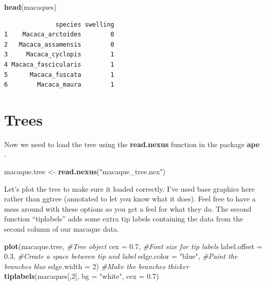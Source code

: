 \documentclass[
]{book}
\newenvironment{Shaded}{\begin{snugshade}}{\end{snugshade}}
\newcommand{\CommentTok}[1]{\textcolor[rgb]{0.56,0.35,0.01}{\textit{#1}}}
\newcommand{\DataTypeTok}[1]{\textcolor[rgb]{0.13,0.29,0.53}{#1}}
\newcommand{\DecValTok}[1]{\textcolor[rgb]{0.00,0.00,0.81}{#1}}
\newcommand{\FloatTok}[1]{\textcolor[rgb]{0.00,0.00,0.81}{#1}}
\newcommand{\KeywordTok}[1]{\textcolor[rgb]{0.13,0.29,0.53}{\textbf{#1}}}
\newcommand{\NormalTok}[1]{#1}
\newcommand{\StringTok}[1]{\textcolor[rgb]{0.31,0.60,0.02}{#1}}
\begin{document}
\begin{Shaded}
\begin{Highlighting}[]
\KeywordTok{head}\NormalTok{(macaques)}
\end{Highlighting}
\end{Shaded}

\begin{verbatim}
              species swelling
1    Macaca_arctoides        0
2   Macaca_assamensis        0
3     Macaca_cyclopis        1
4 Macaca_fascicularis        1
5      Macaca_fuscata        1
6        Macaca_maura        1
\end{verbatim}

\hypertarget{trees}{%
\section{Trees}\label{trees}}

Now we need to load the tree using the \textbf{read.nexus} function in the package \textbf{ape} \citep{ape}.

\begin{Shaded}
\begin{Highlighting}[]
\NormalTok{macaque.tree \textless{}{-}}\StringTok{ }\KeywordTok{read.nexus}\NormalTok{(}\StringTok{"macaque\_tree.nex"}\NormalTok{)}
\end{Highlighting}
\end{Shaded}

Let's plot the tree to make sure it loaded correctly. I've used base graphics here rather than ggtree (annotated to let you know what it does). Feel free to have a mess around with these options so you get a feel for what they do. The second function ``tiplabels'' adds some extra tip labels containing the data from the second column of our macaque data.

\begin{Shaded}
\begin{Highlighting}[]
\KeywordTok{plot}\NormalTok{(macaque.tree,        }\CommentTok{\#Tree object}
     \DataTypeTok{cex =} \FloatTok{0.7}\NormalTok{,           }\CommentTok{\#Font size for tip labels}
     \DataTypeTok{label.offset =} \FloatTok{0.3}\NormalTok{,  }\CommentTok{\#Create a space between tip and label}
     \DataTypeTok{edge.color =} \StringTok{"blue"}\NormalTok{, }\CommentTok{\#Paint the branches blue}
     \DataTypeTok{edge.width =} \DecValTok{2}\NormalTok{)      }\CommentTok{\#Make the branches thicker}
\KeywordTok{tiplabels}\NormalTok{(macaques[,}\DecValTok{2}\NormalTok{], }\DataTypeTok{bg =} \StringTok{"white"}\NormalTok{, }\DataTypeTok{cex =} \FloatTok{0.7}\NormalTok{)}
\end{Highlighting}
\end{Shaded}
\end{document}
